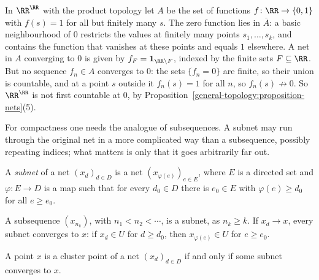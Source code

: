 \begin{example}\label{general-topology:example-pointwise-closure}
In $\RR^\RR$ with the product topology let $A$ be the set of functions $f \colon \RR \to \{0, 1\}$ with $f(s) = 1$ for all but finitely many $s$. The zero function lies in $\overline{A}$: a basic
neighbourhood of $0$ restricts the values at finitely many points $s_1, \ldots, s_k$, and contains the function that vanishes at these points and equals $1$ elsewhere. A net in $A$ converging to $0$
is given by $f_F = \mathbf{1}_{\RR \setminus F}$, indexed by the finite sets $F \subseteq \RR$. But no sequence $f_n \in A$ converges to $0$: the sets $\{f_n = 0\}$ are finite, so their union is
countable, and at a point $s$ outside it $f_n(s) = 1$ for all $n$, so $f_n(s) \not\to 0$. So $\RR^\RR$ is not first countable at $0$, by Proposition~\ref{general-topology:proposition-nets}(5).
\end{example}

For compactness one needs the analogue of subsequences. A subnet may run through the original net in a more complicated way than a subsequence, possibly repeating indices; what matters is only that it goes
arbitrarily far out.

\begin{definition}\label{general-topology:definition-subnet}
A \emph{subnet} of a net $(x_d)_{d \in D}$ is a net $(x_{\varphi(e)})_{e \in E}$, where $E$ is a directed set and $\varphi \colon E \to D$ is a map such that for every $d_0 \in D$ there is $e_0 \in E$ with
$\varphi(e) \geq d_0$ for all $e \geq e_0$.
\end{definition}

A subsequence $(x_{n_k})$, with $n_1 < n_2 < \cdots$, is a subnet, as $n_k \geq k$. If $x_d \to x$, every subnet converges to $x$: if $x_d \in U$ for $d \geq d_0$, then $x_{\varphi(e)} \in U$ for $e \geq e_0$.

\begin{lemma}\label{general-topology:lemma-cluster-subnet}
A point $x$ is a cluster point of a net $(x_d)_{d \in D}$ if and only if some subnet converges to $x$.
\end{lemma}

